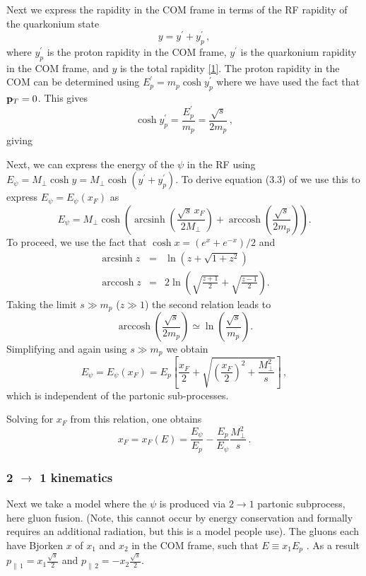 \documentclass[11pt,onecolumn]{article}
\newcommand{\beq}{\begin{equation}}
\newcommand{\eeq}{\end{equation}}
\newcommand{\bqa}{\begin{eqnarray}}
\newcommand{\eqa}{\end{eqnarray}}
\DeclareMathOperator{\arccosh}{arccosh}
\DeclareMathOperator{\arcsinh}{arcsinh}
\begin{document}
Next we express the rapidity in the COM frame in terms of the RF rapidity of the quarkonium state
%
\beq
y = y^\prime + y_p^\prime \, ,
\eeq
%
where $y_p^\prime$ is the proton rapidity in the COM frame, $y^\prime$ is the quarkonium rapidity in the COM frame, and $y$ is the total rapidity \href{https://web.physics.utah.edu/~jui/5110/hw/kin_rel.pdf}{[1]}.  The proton rapidity in the COM can be determined using $E_p^\prime = m_p \cosh y_p^\prime$ where we have used the fact that ${\bf p}_T = 0$.  This gives
%
\beq
\cosh y_p^\prime = \frac{E_p^\prime}{m_p} = \frac{\sqrt{s}}{2m_p} \, ,
\eeq
%
giving

Next, we can express the energy of the $\psi$ in the RF using $E_\psi = M_\perp \cosh y =  M_\perp \cosh (y^\prime + y_p^\prime)$.  To derive equation (3.3) of \cite{Arleo:2012rs} we use this to express $E_\psi = E_\psi(x_F)$ as
%
\beq
E_\psi = M_\perp \cosh\!\left( \arcsinh\!\left( \frac{\sqrt{s} \, x_F}{2 M_\perp}\right) + \arccosh\!\left( \frac{\sqrt{s}}{2m_p} \right) \right) .
\eeq 
%
To proceed, we use the fact that $\cosh x = (e^x + e^{-x})/2$ and
%
\bqa
\arcsinh z &=& \ln\!\left(z + \sqrt{1+z^2}\right) \, \nonumber \\
\arccosh z &=& 2 \ln\!\left( \sqrt{\frac{z+1}{2}} + \sqrt{\frac{z-1}{2}} \right) .
\eqa
%
Taking the limit $s \gg m_p$ ($z \gg 1$) the second relation leads to
%
\beq
\arccosh\!\left( \frac{\sqrt{s}}{2m_p} \right) \simeq \ln\!\left( \frac{\sqrt{s}}{m_p} \right) .
\eeq
%
Simplifying and again using $s \gg m_p$ we obtain
%
\beq
E_\psi = E_\psi(x_F) = E_p \left[ \frac{x_F}{2} + \sqrt{ \left( \frac{x_F}{2} \right)^2 + \frac{M_\perp^2}{s} } \right] \, ,
\eeq
%
which is independent of the partonic sub-processes. 

Solving for $x_F$ from this relation, one obtains
%
\beq
x_F = x_F(E) = \frac{E_\psi}{E_p} - \frac{E_p}{E_\psi} \frac{M_\perp^2}{s} \, .
\eeq

\subsubsection*{2 $\rightarrow$ 1 kinematics}

Next we take a model where the $\psi$ is produced via $ 2 \rightarrow 1$ partonic subprocess, here gluon fusion.  (Note, this cannot occur by energy conservation and formally requires an additional radiation, but this is a model people use).  The gluons each have Bjorken $x$ of $x_1$ and $x_2$ in the COM frame, such that $E \equiv x_1 E_p$ \cite{Arleo:2014oha}.  As a result $p_{\parallel \, 1} = x_1 \frac{\sqrt{s}}{2}$ and $p_{\parallel \, 2} = -x_2 \frac{\sqrt{s}}{2}$.  
\end{document}
